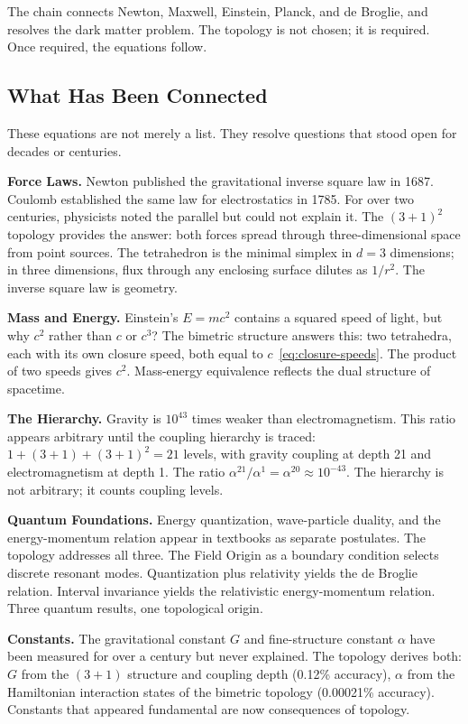 \documentclass[aps,prd,preprint,superscriptaddress,showpacs,preprintnumbers,amsmath,amssymb,nofootinbib]{revtex4-2}
\begin{document}
The chain connects Newton, Maxwell, Einstein, Planck, and de Broglie, and resolves the dark matter problem. The topology is not chosen; it is required. Once required, the equations follow.

\subsection{What Has Been Connected}
\label{subsec:connections}

These equations are not merely a list. They resolve questions that stood open for decades or centuries.

\textbf{Force Laws.} Newton published the gravitational inverse square law in 1687. Coulomb established the same law for electrostatics in 1785. For over two centuries, physicists noted the parallel but could not explain it. The $(3+1)^2$ topology provides the answer: both forces spread through three-dimensional space from point sources. The tetrahedron is the minimal simplex in $d = 3$ dimensions; in three dimensions, flux through any enclosing surface dilutes as $1/r^2$. The inverse square law is geometry.

\textbf{Mass and Energy.} Einstein's $E = mc^2$ contains a squared speed of light, but why $c^2$ rather than $c$ or $c^3$? The bimetric structure answers this: two tetrahedra, each with its own closure speed, both equal to $c$~\eqref{eq:closure-speeds}. The product of two speeds gives $c^2$. Mass-energy equivalence reflects the dual structure of spacetime.

\textbf{The Hierarchy.} Gravity is $10^{43}$ times weaker than electromagnetism. This ratio appears arbitrary until the coupling hierarchy is traced: $1 + (3+1) + (3+1)^2 = 21$ levels, with gravity coupling at depth 21 and electromagnetism at depth 1. The ratio $\alpha^{21}/\alpha^{1} = \alpha^{20} \approx 10^{-43}$. The hierarchy is not arbitrary; it counts coupling levels.

\textbf{Quantum Foundations.} Energy quantization, wave-particle duality, and the energy-momentum relation appear in textbooks as separate postulates. The topology addresses all three. The Field Origin as a boundary condition selects discrete resonant modes. Quantization plus relativity yields the de Broglie relation. Interval invariance yields the relativistic energy-momentum relation. Three quantum results, one topological origin.

\textbf{Constants.} The gravitational constant $G$ and fine-structure constant $\alpha$ have been measured for over a century but never explained. The topology derives both: $G$ from the $(3+1)$ structure and coupling depth (0.12\% accuracy), $\alpha$ from the Hamiltonian interaction states of the bimetric topology (0.00021\% accuracy). Constants that appeared fundamental are now consequences of topology.
\end{document}
